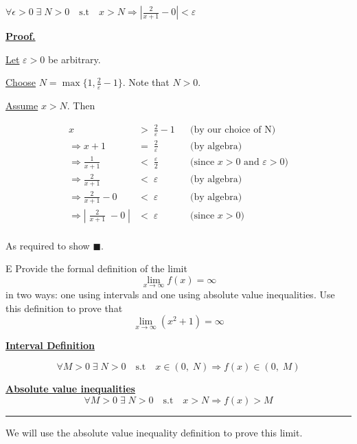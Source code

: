 \documentclass[]{article}
\begin{document}
\begin{center}
    $\forall \epsilon > 0\;\exists\; N>0 \quad \text{s.t} \quad 
    x > N \Longrightarrow |\frac{2}{x+1} - 0| < \varepsilon$
\end{center}
\underline{\bf{Proof.}}

\underline{Let} $\varepsilon > 0$ be arbitrary.

\medbreak

\underline{Choose} $N = \max\{ 1, \frac{2}{\varepsilon} - 1 \}$. Note that $N > 0$.

\medbreak

\underline{Assume} $x > N$. Then

\begin{align*}
    x  & >\; \frac{2}{\varepsilon} - 1
        && \text{(by our choice of N)} \\[6pt]
    \Longrightarrow x+1 &=\; \frac{2}{\varepsilon}
        && \text{(by algebra)} \\[6pt]
    \Longrightarrow \frac{1}{x+1}  &<\; \frac{\varepsilon}{2}
        && \text{(since $x > 0$ and $\varepsilon > 0$)} \\[6pt]
    \Longrightarrow \frac{2}{x+1}  &<\; \varepsilon
        && \text{(by algebra)} \\[6pt]
    \Longrightarrow \frac{2}{x+1} - 0 &<\; \varepsilon
        && \text{(by algebra)} \\[6pt]
    \Longrightarrow |\;\frac{2}{x+1}\; - 0\;| &<\; \varepsilon
        && \text{(since $x > 0$)} \\[6pt]
\end{align*}


As required to show $\blacksquare$.
\begin{question}{E}
    Provide the formal definition of the limit
    \[
    \lim_{x \to \infty} f(x) = \infty
    \]
    in two ways: one using intervals and one using absolute value inequalities. Use this definition to prove that
    \[
    \lim_{x \to \infty} (x^2+1) = \infty
    \]
\end{question}

\underline{\bf{Interval Definition}}

\[
    \forall M > 0 \;\exists\;N > 0 \quad \text{s.t} \quad x \in(0, \;N) \Longrightarrow f(x) \in (0, \;M)
\]

\underline{\bf{Absolute value inequalities}}
\[
    \forall M > 0\;\exists\; N>0 \quad \text{s.t} \quad 
    x > N \Longrightarrow f(x) > M
\]

\hrule
\vspace{0.1in}
We will use the absolute value inequality definition to prove this limit.
\end{document}
